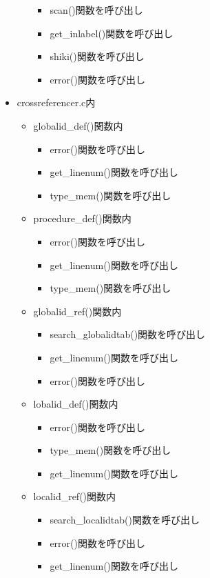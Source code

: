 \documentclass{jarticle}
\begin{document}
\begin{itemize}
\begin{itemize}
    \begin{itemize}
      \item scan()関数を呼び出し
      \item get\_inlabel()関数を呼び出し
      \item shiki()関数を呼び出し
      \item error()関数を呼び出し
    \end{itemize}
  \end{itemize}
  \item crossreferencer.c内
  \begin{itemize}
    \item globalid\_def()関数内
    \begin{itemize}
      \item error()関数を呼び出し
      \item get\_linenum()関数を呼び出し
      \item type\_mem()関数を呼び出し
    \end{itemize}
    \item procedure\_def()関数内
    \begin{itemize}
      \item error()関数を呼び出し
      \item get\_linenum()関数を呼び出し
      \item type\_mem()関数を呼び出し
    \end{itemize}
    \item globalid\_ref()関数内
    \begin{itemize}
      \item search\_globalidtab()関数を呼び出し
      \item get\_linenum()関数を呼び出し
      \item error()関数を呼び出し
    \end{itemize}
    \item lobalid\_def()関数内
    \begin{itemize}
      \item error()関数を呼び出し
      \item type\_mem()関数を呼び出し
      \item get\_linenum()関数を呼び出し
    \end{itemize}
    \item localid\_ref()関数内
    \begin{itemize}
      \item search\_localidtab()関数を呼び出し
      \item error()関数を呼び出し
      \item get\_linenum()関数を呼び出し

\end{itemize}
\end{itemize}
\end{itemize}
\end{document}
